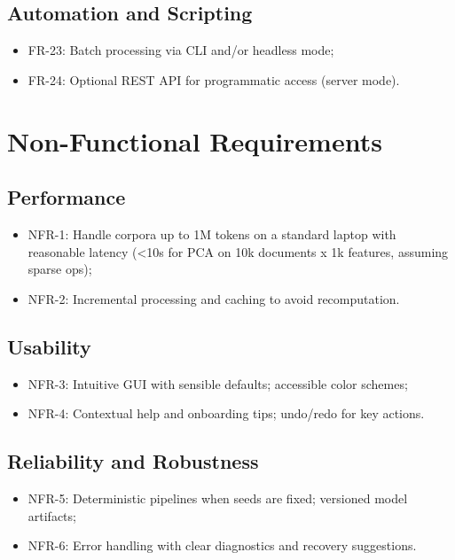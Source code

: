 \subsection{Automation and Scripting}
\begin{itemize}
    \item FR-23: Batch processing via CLI and/or headless mode;
    \item FR-24: Optional REST API for programmatic access (server mode).
\end{itemize}

\section{Non-Functional Requirements}
\subsection{Performance}
\begin{itemize}
    \item NFR-1: Handle corpora up to 1M tokens on a standard laptop with reasonable latency (\textless 10s for PCA on 10k documents x 1k features, assuming sparse ops);
    \item NFR-2: Incremental processing and caching to avoid recomputation.
\end{itemize}

\subsection{Usability}
\begin{itemize}
    \item NFR-3: Intuitive GUI with sensible defaults; accessible color schemes;
    \item NFR-4: Contextual help and onboarding tips; undo/redo for key actions.
\end{itemize}

\subsection{Reliability and Robustness}
\begin{itemize}
    \item NFR-5: Deterministic pipelines when seeds are fixed; versioned model artifacts;
    \item NFR-6: Error handling with clear diagnostics and recovery suggestions.
\end{itemize}

